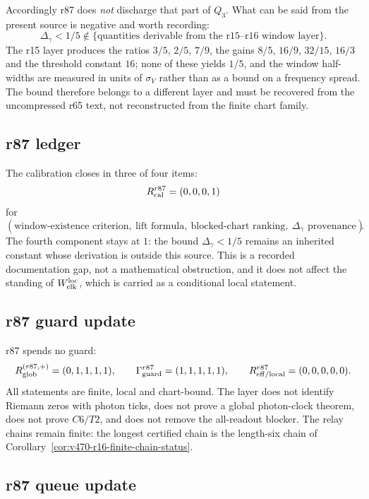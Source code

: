 Accordingly r87 does \emph{not} discharge that part of \(Q_3\).  What can be said from the
present source is negative and worth recording:
\[
\Delta_\gamma<1/5 \notin \{\text{quantities derivable from the r15--r16 window layer}\}.
\]
The r15 layer produces the ratios \(3/5\), \(2/5\), \(7/9\), the gains \(8/5\), \(16/9\),
\(32/15\), \(16/3\) and the threshold constant \(16\); none of these yields \(1/5\), and the
window half-widths are measured in units of \(\sigma_V\) rather than as a bound on a
frequency spread.  The bound therefore belongs to a different layer and must be recovered
from the uncompressed r65 text, not reconstructed from the finite chart family.

\subsection*{r87 ledger}
\label{subsec:r87-ledger}

The calibration closes in three of four items:
\[
R_{\rm cal}^{r87}=(0,0,0,1)
\]
for
\[
(\text{window-existence criterion},\ \text{lift formula},\ \text{blocked-chart ranking},
\ \Delta_\gamma\text{ provenance}).
\]
The fourth component stays at \(1\): the bound \(\Delta_\gamma<1/5\) remains an inherited
constant whose derivation is outside this source.  This is a recorded documentation gap, not
a mathematical obstruction, and it does not affect the standing of
\(W_{\rm clk}^{\rm loc}\), which is carried as a conditional local statement.

\subsection*{r87 guard update}
\label{subsec:r87-guard-update}

r87 spends no guard:
\[
R_{\rm glob}^{(r87,+)}=(0,1,1,1,1),
\qquad
\Gamma_{\rm guard}^{r87}=(1,1,1,1,1),
\qquad
R_{\rm eff/local}^{r87}=(0,0,0,0,0).
\]
All statements are finite, local and chart-bound.  The layer does not identify Riemann zeros
with photon ticks, does not prove a global photon-clock theorem, does not prove
\(C6/T2\), and does not remove the all-readout blocker.  The relay chains remain finite:
the longest certified chain is the length-six chain of
Corollary~\ref{cor:v470-r16-finite-chain-status}.

\subsection*{r87 queue update}
\label{subsec:r87-queue-update}

